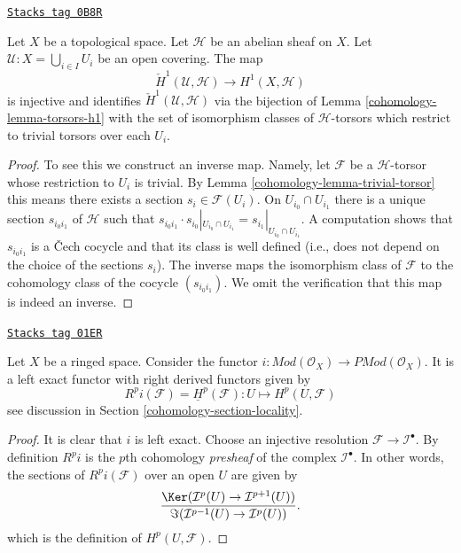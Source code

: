 \begin{lemma}[Cech h1]
\label{cohomology-lemma-cech-h1}
\href{https://stacks.math.columbia.edu/tag/0B8R}{\texttt{Stacks tag 0B8R}}

Let $X$ be a topological space. Let $\mathcal{H}$ be an abelian sheaf
on $X$. Let $\mathcal{U} : X = \bigcup_{i \in I} U_i$ be an open covering.
The map
$$
\check{H}^1(\mathcal{U}, \mathcal{H}) \longrightarrow H^1(X, \mathcal{H})
$$
is injective and identifies $\check{H}^1(\mathcal{U}, \mathcal{H})$ via
the bijection of Lemma \ref{cohomology-lemma-torsors-h1}
with the set of isomorphism classes of $\mathcal{H}$-torsors
which restrict to trivial torsors over each $U_i$.
\end{lemma}

\begin{proof}

To see this we construct an inverse map. Namely, let $\mathcal{F}$ be a
$\mathcal{H}$-torsor whose restriction to $U_i$ is trivial. By
Lemma \ref{cohomology-lemma-trivial-torsor} this means there
exists a section $s_i \in \mathcal{F}(U_i)$. On $U_{i_0} \cap U_{i_1}$
there is a unique section $s_{i_0i_1}$ of $\mathcal{H}$ such that
$s_{i_0i_1} \cdot s_{i_0}|_{U_{i_0} \cap U_{i_1}} =
s_{i_1}|_{U_{i_0} \cap U_{i_1}}$. A computation shows
that $s_{i_0i_1}$ is a {\v C}ech cocycle and that its class is well
defined (i.e., does not depend on the choice of the sections $s_i$).
The inverse maps the isomorphism class of $\mathcal{F}$ to the cohomology
class of the cocycle $(s_{i_0i_1})$.
We omit the verification that this map is indeed an inverse.
\end{proof}

\begin{lemma}[Include]
\label{cohomology-lemma-include}
\href{https://stacks.math.columbia.edu/tag/01ER}{\texttt{Stacks tag 01ER}}

Let $X$ be a ringed space.
Consider the functor
$i : \textit{Mod}(\mathcal{O}_X) \to \textit{PMod}(\mathcal{O}_X)$.
It is a left exact functor with right derived functors given by
$$
R^pi(\mathcal{F}) = \underline{H}^p(\mathcal{F}) :
U \longmapsto H^p(U, \mathcal{F})
$$
see discussion in Section \ref{cohomology-section-locality}.
\end{lemma}

\begin{proof}
It is clear that $i$ is left exact.
Choose an injective resolution $\mathcal{F} \to \mathcal{I}^\bullet$.
By definition $R^pi$ is the $p$th cohomology {\it presheaf}
of the complex $\mathcal{I}^\bullet$. In other words, the
sections of $R^pi(\mathcal{F})$ over an open $U$ are given by
$$
\frac{\Ker(\mathcal{I}^p(U) \to \mathcal{I}^{p + 1}(U))}
{\Im(\mathcal{I}^{p - 1}(U) \to \mathcal{I}^p(U))}.
$$
which is the definition of $H^p(U, \mathcal{F})$.
\end{proof}

